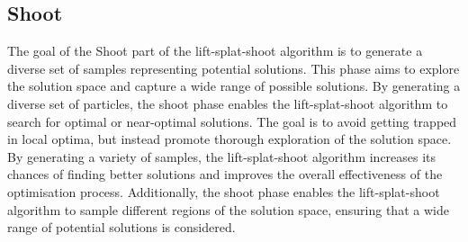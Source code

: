 \documentclass{uva-inf-bachelor-thesis}
\begin{document}
        \subsection{Shoot}
            The goal of the Shoot part of the lift-splat-shoot algorithm is to generate a diverse set of samples representing potential solutions. This phase aims to explore the solution space and capture a wide range of possible solutions. By generating a diverse set of particles, the shoot phase enables the lift-splat-shoot algorithm to search for optimal or near-optimal solutions. The goal is to avoid getting trapped in local optima, but instead promote thorough exploration of the solution space. By generating a variety of samples, the lift-splat-shoot algorithm increases its chances of finding better solutions and improves the overall effectiveness of the optimisation process. Additionally, the shoot phase enables the lift-splat-shoot algorithm to sample different regions of the solution space, ensuring that a wide range of potential solutions is considered.


        
\end{document}
